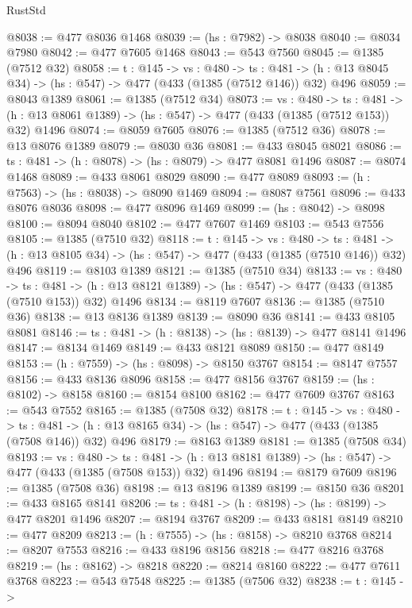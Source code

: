\begin{lexlean}{RustStd}
\begin{coremodule}
{\begin{coremodule}
{{{{{{{{{{{{{{{{@8038 := @477 @8036 @1468
@8039 := (hs : @7982) -> @8038
@8040 := @8034 @7980
@8042 := @477 @7605 @1468
@8043 := @543 @7560
@8045 := @1385 (@7512 @32)
@8058 := {t : @145} ->
  {vs : @480} ->
  {ts : @481} -> (h : @13 @8045 @34) -> (hs : @547) -> @477 (@433 (@1385 (@7512 @146)) @32) @496
@8059 := @8043 @1389
@8061 := @1385 (@7512 @34)
@8073 := {vs : @480} ->
  {ts : @481} -> (h : @13 @8061 @1389) -> (hs : @547) -> @477 (@433 (@1385 (@7512 @153)) @32) @1496
@8074 := @8059 @7605
@8076 := @1385 (@7512 @36)
@8078 := @13 @8076 @1389
@8079 := @8030 @36
@8081 := @433 @8045 @8021
@8086 := {ts : @481} -> (h : @8078) -> (hs : @8079) -> @477 @8081 @1496
@8087 := @8074 @1468
@8089 := @433 @8061 @8029
@8090 := @477 @8089
@8093 := (h : @7563) -> (hs : @8038) -> @8090 @1469
@8094 := @8087 @7561
@8096 := @433 @8076 @8036
@8098 := @477 @8096 @1469
@8099 := (hs : @8042) -> @8098
@8100 := @8094 @8040
@8102 := @477 @7607 @1469
@8103 := @543 @7556
@8105 := @1385 (@7510 @32)
@8118 := {t : @145} ->
  {vs : @480} ->
  {ts : @481} -> (h : @13 @8105 @34) -> (hs : @547) -> @477 (@433 (@1385 (@7510 @146)) @32) @496
@8119 := @8103 @1389
@8121 := @1385 (@7510 @34)
@8133 := {vs : @480} ->
  {ts : @481} -> (h : @13 @8121 @1389) -> (hs : @547) -> @477 (@433 (@1385 (@7510 @153)) @32) @1496
@8134 := @8119 @7607
@8136 := @1385 (@7510 @36)
@8138 := @13 @8136 @1389
@8139 := @8090 @36
@8141 := @433 @8105 @8081
@8146 := {ts : @481} -> (h : @8138) -> (hs : @8139) -> @477 @8141 @1496
@8147 := @8134 @1469
@8149 := @433 @8121 @8089
@8150 := @477 @8149
@8153 := (h : @7559) -> (hs : @8098) -> @8150 @3767
@8154 := @8147 @7557
@8156 := @433 @8136 @8096
@8158 := @477 @8156 @3767
@8159 := (hs : @8102) -> @8158
@8160 := @8154 @8100
@8162 := @477 @7609 @3767
@8163 := @543 @7552
@8165 := @1385 (@7508 @32)
@8178 := {t : @145} ->
  {vs : @480} ->
  {ts : @481} -> (h : @13 @8165 @34) -> (hs : @547) -> @477 (@433 (@1385 (@7508 @146)) @32) @496
@8179 := @8163 @1389
@8181 := @1385 (@7508 @34)
@8193 := {vs : @480} ->
  {ts : @481} -> (h : @13 @8181 @1389) -> (hs : @547) -> @477 (@433 (@1385 (@7508 @153)) @32) @1496
@8194 := @8179 @7609
@8196 := @1385 (@7508 @36)
@8198 := @13 @8196 @1389
@8199 := @8150 @36
@8201 := @433 @8165 @8141
@8206 := {ts : @481} -> (h : @8198) -> (hs : @8199) -> @477 @8201 @1496
@8207 := @8194 @3767
@8209 := @433 @8181 @8149
@8210 := @477 @8209
@8213 := (h : @7555) -> (hs : @8158) -> @8210 @3768
@8214 := @8207 @7553
@8216 := @433 @8196 @8156
@8218 := @477 @8216 @3768
@8219 := (hs : @8162) -> @8218
@8220 := @8214 @8160
@8222 := @477 @7611 @3768
@8223 := @543 @7548
@8225 := @1385 (@7506 @32)
@8238 := {t : @145} ->
}}}}}}}}}}}}}}}}
\end{coremodule}}
\end{coremodule}
\end{lexlean}

